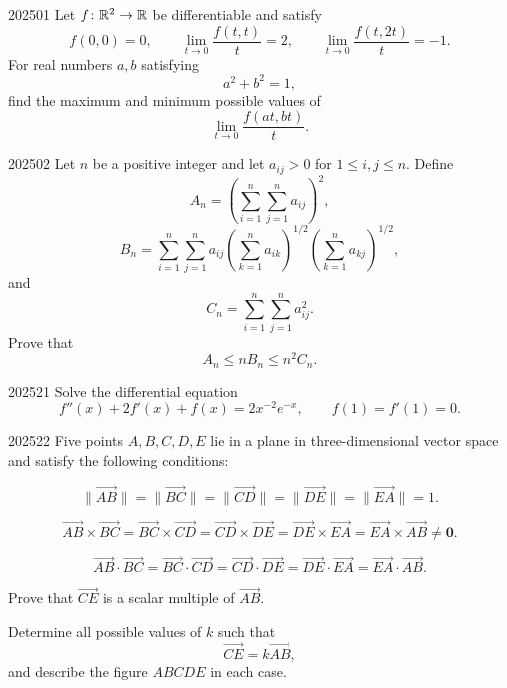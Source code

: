 
\begin{problem}{2025}{0}{1}
Let $f\colon\mathbb{R}^2\to\mathbb{R}$ be differentiable and satisfy
\[
    f(0, 0)=0,
    \qquad
    \lim_{t\to0}\frac{f(t, t)}{t}=2,
    \qquad
    \lim_{t\to0}\frac{f(t, 2t)}{t}=-1.
\]
For real numbers $a, b$ satisfying
\[
    a^2+b^2=1,
\]
find the maximum and minimum possible values of
\[
    \lim_{t\to0}\frac{f(at, bt)}{t}.
\]
\end{problem}

\begin{problem}{2025}{0}{2}
Let $n$ be a positive integer and let $a_{ij}>0$ for $1\le i, j\le n$. Define
\[
    A_n=
    \left(\sum_{i=1}^n\sum_{j=1}^n a_{ij}\right)^2,
\]
\[
    B_n=
    \sum_{i=1}^n\sum_{j=1}^n
    a_{ij}
    \left(\sum_{k=1}^n a_{ik}\right)^{1/2}
    \left(\sum_{k=1}^n a_{kj}\right)^{1/2},
\]
and
\[
    C_n=
    \sum_{i=1}^n\sum_{j=1}^n a_{ij}^2.
\]
Prove that
\[
    A_n\le nB_n\le n^2C_n.
\]
\end{problem}

\begin{problem}{2025}{2}{1}
Solve the differential equation
\[
    f''(x)+2f'(x)+f(x)=2x^{-2}e^{-x},
    \qquad
    f(1)=f'(1)=0.
\]
\end{problem}

\begin{problem}{2025}{2}{2}
Five points $A, B, C, D, E$ lie in a plane in three-dimensional vector space and satisfy the following conditions:
\begin{problemclauses}
    \item
    \[
        \|\overrightarrow{AB}\|
        =\|\overrightarrow{BC}\|
        =\|\overrightarrow{CD}\|
        =\|\overrightarrow{DE}\|
        =\|\overrightarrow{EA}\|=1.
    \]
    \item
    \[
        \overrightarrow{AB}\times\overrightarrow{BC}
        =\overrightarrow{BC}\times\overrightarrow{CD}
        =\overrightarrow{CD}\times\overrightarrow{DE}
        =\overrightarrow{DE}\times\overrightarrow{EA}
        =\overrightarrow{EA}\times\overrightarrow{AB}
        \ne\mathbf0.
    \]
    \item
    \[
        \overrightarrow{AB}\cdot\overrightarrow{BC}
        =\overrightarrow{BC}\cdot\overrightarrow{CD}
        =\overrightarrow{CD}\cdot\overrightarrow{DE}
        =\overrightarrow{DE}\cdot\overrightarrow{EA}
        =\overrightarrow{EA}\cdot\overrightarrow{AB}.
    \]
\end{problemclauses}
\begin{problemsubparts}
    \item Prove that $\overrightarrow{CE}$ is a scalar multiple of $\overrightarrow{AB}$.
    \item Determine all possible values of $k$ such that
    \[
        \overrightarrow{CE}=k\overrightarrow{AB},
    \]
    and describe the figure $ABCDE$ in each case.
\end{problemsubparts}
\end{problem}

